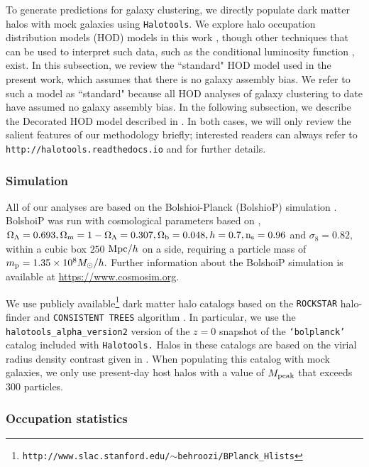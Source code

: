 \documentclass[usenatbib,usegraphicx,letterpaper]{mn2e}
\begin{document}
To generate predictions for galaxy clustering, we directly populate dark matter halos with mock galaxies using {\tt Halotools}.
We explore halo occupation distribution models (HOD) models in this work
\citep[e.g.][]{seljak00,ma_fry00,scoccimarro01a,berlind02}, though other
techniques that can be used to interpret such data, such as the conditional luminosity function
\citep[CLF, e.g.,][]{yang03,vdBosch13}, exist. In this subsection, we review the ``standard" HOD
model used in the present work, which assumes that there is no galaxy assembly bias. We refer to
such a model as ``standard" because all HOD analyses of galaxy clustering to date have assumed no
galaxy assembly bias. In the following subsection, we describe
the Decorated HOD model described in \citet{hearin_etal16}. In both cases, we will only
review the salient features of our methodology briefly;
interested readers can always refer to {\tt http://halotools.readthedocs.io} and
\citet{hearin_etal16} for further details.


\subsubsection{Simulation}

All of our analyses are based on the Bolshioi-Planck (BolshioP) simulation \citep{riebe_etal11}.
BolshoiP was run with cosmological parameters based on \citet{planck13},
$\Omega_{\Lambda} = 0.693, \Omega_{\rm m} = 1 - \Omega_{\Lambda} = 0.307, \Omega_{\rm b} = 0.048,
h = 0.7, {\rm n_s}=0.96$ and $\sigma_8 = 0.82,$ within a cubic box
$250$ ${\rm Mpc}/h$ on a side, requiring a particle mass of $m_{\rm p} = 1.35\times10^{8}M_{\odot}/h.$
Further information about the BolshoiP simulation is available at \url{https://www.cosmosim.org}.

We use publicly available\footnote{\tt http://www.slac.stanford.edu/$\sim$behroozi/BPlanck\_Hlists} dark matter
halo catalogs based on the {\tt ROCKSTAR} halo-finder \citep{behroozi_rockstar11} and {\tt CONSISTENT TREES} algorithm \citep{behroozi_trees13}. In particular, we use the {\tt halotools\_alpha\_version2} version of the $z=0$ snapshot
of the {\tt `bolplanck'} catalog included with {\tt Halotools.} Halos in these catalogs are based on the virial radius
density contrast given in \citet{bryan_norman98}. When populating this catalog with mock galaxies, we only use
present-day host halos with a value of $M_{\rm peak}$ that exceeds $300$ particles.


\subsubsection{Occupation statistics}
\end{document}
